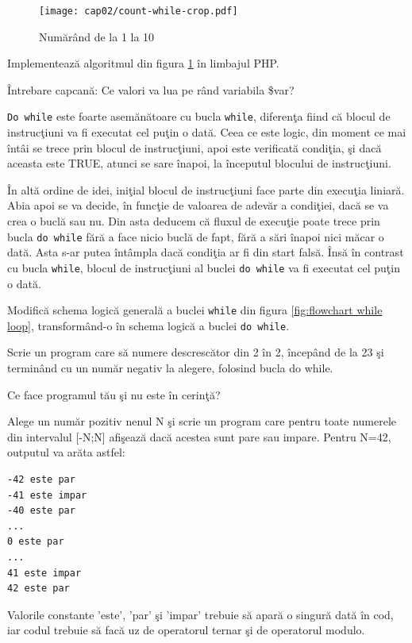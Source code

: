 \begin{figure}[ht!]
  \centering
    \texttt{[image: cap02/count-while-crop.pdf]}
  \caption{Numărând de la 1 la 10}
  \label{fig:while counting}
\end{figure}

\begin{Exercise}[title={Numărătoarea din 1 în 1 cu while},difficulty=1]
\ExePart
Implementează algoritmul din figura \ref{fig:while counting} în limbajul PHP.

\ExePart
Întrebare capcană: Ce valori va lua pe rând variabila \$var?
\end{Exercise}

\texttt{Do while} este foarte asemănătoare cu bucla \texttt{while},
diferenţa fiind că blocul de instrucţiuni va fi executat cel
puţin o dată. Ceea ce este logic, din moment ce mai întâi se
trece prin blocul de instrucţiuni, apoi este verificată condiţia, şi
dacă aceasta este TRUE, atunci se sare înapoi, la începutul blocului de
instrucţiuni.

În altă ordine de idei, iniţial blocul de instrucţiuni
face parte din execuţia liniară. Abia apoi se va decide, în funcţie de valoarea
de adevăr a condiţiei, dacă se va crea o buclă sau nu. Din asta deducem
că fluxul de execuţie poate trece prin {\glqq}bucla{\grqq} \texttt{do while} fără
a face nicio buclă de fapt, fără a sări înapoi nici măcar o dată. Asta s-ar putea
întâmpla dacă condiţia ar fi din start falsă. Însă în contrast cu bucla
\texttt{while}, blocul de instrucţiuni al buclei \texttt{do while} va fi executat cel
puţin o dată.

\begin{Exercise}[title={Schema logică a buclei do while},difficulty=1]
Modifică schema logică generală a buclei \texttt{while} din
figura \ref{fig:flowchart while loop}, transformând-o în
schema logică a buclei \texttt{do while}.
\end{Exercise}


\begin{Exercise}[title={Numărătoarea din doi în doi cu do while},difficulty=1]
\ExePart
Scrie un program care să numere descrescător din 2 în 2, începând de la 23
şi terminând cu un număr negativ la alegere, folosind bucla do while.

\ExePart
Ce face programul tău şi nu este în cerinţă?
\end{Exercise}

\begin{Exercise}[title={Par sau impar?},difficulty=2]
Alege un număr pozitiv nenul N şi scrie un program care
pentru toate numerele din intervalul [-N;N] afişează dacă acestea sunt pare
sau impare. Pentru N=42, outputul va arăta astfel:
\begin{verbatim}
-42 este par
-41 este impar
-40 este par
...
0 este par
...
41 este impar
42 este par
\end{verbatim}
Valorile constante 'este', 'par' şi 'impar' trebuie să apară o singură dată în
cod, iar codul trebuie să facă uz de operatorul ternar şi de operatorul modulo.
\end{Exercise}

